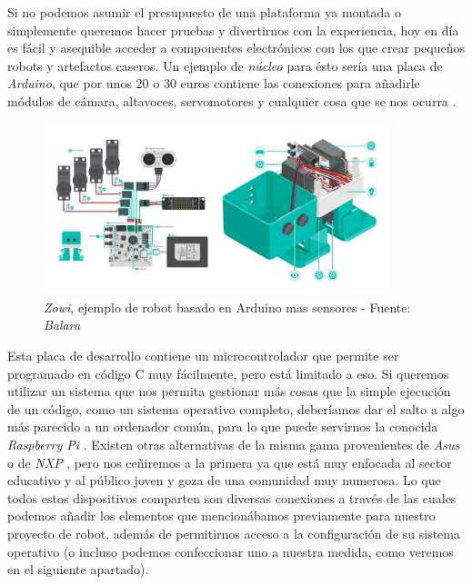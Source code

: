 Si no podemos asumir el presupuesto de una plataforma ya montada o simplemente queremos hacer pruebas y divertirnos con la experiencia, hoy en día es fácil y asequible acceder a componentes electrónicos con los que crear pequeños robots y artefactos caseros. Un ejemplo de \textit{núcleo} para ésto sería una placa de \textit{Arduino}, que por unos 20 o 30 euros contiene las conexiones para añadirle módulos de cámara, altavoces, servomotores y cualquier cosa que se nos ocurra \cite{arduino-store}.\\

\begin{figure}[h]
	\centering
	\includegraphics[width=0.9\textwidth]{imagenes/zowi-robot-componentes.jpg}
	\caption{\textit{Zowi}, ejemplo de robot basado en Arduino mas sensores - Fuente: \textit{Balara} \cite{zowi-balara}}
\end{figure}

Esta placa de desarrollo contiene un microcontrolador que permite ser programado en código C muy fácilmente, pero está limitado a eso. Si queremos utilizar un sistema que nos permita gestionar más cosas que la simple ejecución de un código, como un sistema operativo completo, deberíamos dar el salto a algo más parecido a un ordenador común, para lo que puede servirnos la conocida \textit{Raspberry Pi} \cite{raspberry-pi}. Existen otras alternativas de la misma gama provenientes de \textit{Asus} o de \textit{NXP} \cite{nxp-imx}, pero nos ceñiremos a la primera ya que está muy enfocada al sector educativo y al público joven y goza de una comunidad muy numerosa. Lo que todos estos dispositivos comparten son diversas conexiones a través de las cuales podemos añadir los elementos que mencionábamos previamente para nuestro proyecto de robot, además de permitirnos acceso a la configuración de su sistema operativo (o incluso podemos confeccionar uno a nuestra medida, como veremos en el siguiente apartado).\\

